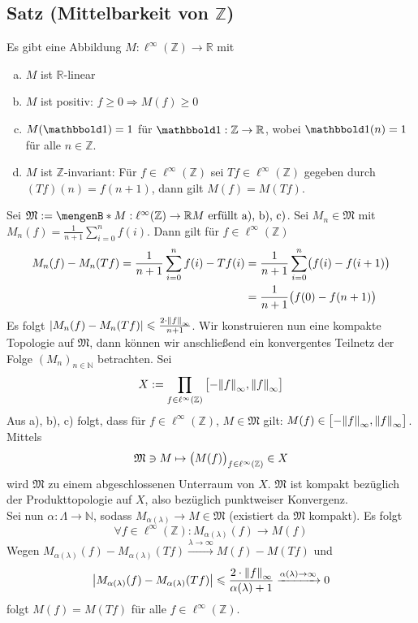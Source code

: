\subsection{Satz (Mittelbarkeit von $\mathds{Z}$)} %
\label{sub:414}
Es gibt eine Abbildung $M : \ell^\infty(\mathds{Z}) \to \mathds{R} $ mit
\begin{enumerate}[a)]
	\item $M$ ist $\mathds{R}$-linear
	\item $M$ ist positiv: $f \ge 0 \Rightarrow M(f) \ge 0$
	\item $M(\ind) =1$ für $\ind: \mathds{Z} \to \mathds{R}$, wobei $\ind(n)=1$ für alle $n \in \mathds{Z}$.
	\item $M$ ist $\mathds{Z}$-invariant: Für $f \in \ell^\infty(\mathds{Z}) $ sei $T f \in \ell^\infty(\mathds{Z})$ gegeben durch $(T f) (n) = f(n+1)$, 
	dann gilt $M(f)= M(T f)$.
\end{enumerate}
Sei $\mathfrak{M} := \set[M : \ell^\infty(\mathds{Z}) \to \mathds{R}]{M \text{ erfüllt a), b), c)}} $. Sei $M_n \in \mathfrak{M}$ mit 
$M_n(f) = \frac{1}{n+1} \sum_{i=0}^{n} f(i) $. Dann gilt für $f \in \ell^\infty(\mathds{Z})$
\begin{align*}
	M_n(f) - M_n(T f) = \frac{1}{n+1} \sum_{i=0}^{n}  f(i) - T f(i) &= \frac{1}{n+1} \sum_{i=0}^{n} \enbrace[\big]{f(i)- f(i+1) } \\
	&=   \frac{1}{n+1} \enbrace[\big]{f(0)- f(n+1)} 
\end{align*}
Es folgt $\abs*{M_n(f) - M_n(T f)} \le \frac{2 \cdot \norm[\infty]{f} }{n+1}$. Wir konstruieren nun eine kompakte Topologie auf $\mathfrak{M}$, dann können wir anschließend
ein konvergentes Teilnetz der Folge $(M_n)_{n \in \mathds{N}}$ betrachten. Sei 
\[
	X := \prod_{f \in \ell^\infty(\mathds{Z})} \big[{- \norm[\infty]{f}}, \norm[\infty]{f} \big]
\]
Aus a), b), c) folgt, dass für $f \in \ell^\infty(\mathds{Z})$, $M \in \mathfrak{M}$ gilt: $M(f) \in \big[{- \norm[\infty]{f}}, \norm[\infty]{f}\big]$. Mittels 
\[
	\mathfrak{M} \ni M \mapsto \enbrace[\big]{M(f)}_{f \in \ell^\infty(\mathds{Z})} \in X 
\]
wird $\mathfrak{M}$ zu einem abgeschlossenen Unterraum von $X$. $\mathfrak{M}$ ist 
kompakt bezüglich der Produkttopologie auf $X$, also bezüglich punktweiser Konvergenz. \\
Sei nun $\alpha : \Lambda \to \mathds{N}$, sodass $M_{\alpha(\lambda)} \to M \in \mathfrak{M}$ (existiert da $\mathfrak{M}$ kompakt). Es folgt
\[
	\forall f \in \ell^\infty(\mathds{Z}) : M_{\alpha(\lambda )}(f) \to M(f) 
\]
Wegen $M_{\alpha(\lambda )}(f) - M_{\alpha(\lambda )}(T f) \xrightarrow{\lambda  \to \infty} M(f) - M(T f) $ und
\begin{align*}
	\abs*{M_{\alpha(\lambda )}(f) - M_{\alpha(\lambda )}(T f)} \le \frac{2 \cdot \norm[\infty]{f} }{\alpha(\lambda )+1} \xrightarrow{\alpha(\lambda ) \to \infty}  0  
\end{align*}
folgt $M(f) = M(T f)$ für alle $f \in \ell^\infty(\mathds{Z})$. \bewende
\newpage

